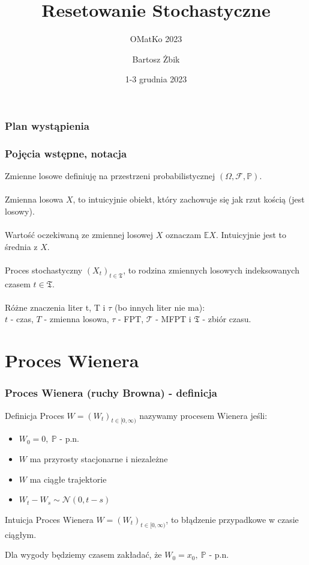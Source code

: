 \documentclass{beamer}
\title{Resetowanie Stochastyczne}
\subtitle{OMatKo 2023}
\author{Bartosz \.Zbik}
\institute{UJ, Kraków}
\date{1-3 grudnia 2023}
\newcommand{\p}{\mathbb{P}}
\newcommand{\E}{\mathbb{E}}
\newcommand{\1}{\mathbb{1}}
\newcommand{\T}{\mathcal{T}}
\newcommand{\F}{\mathcal{F}}
\newcommand{\Time}{\mathfrak{T}}
\begin{document}
\begin{frame}
\titlepage
\end{frame}

\begin{frame}
\frametitle{Plan wystąpienia}
\tableofcontents
\end{frame}



\begin{frame}
\frametitle{Pojęcia wstępne, notacja}
Zmienne losowe definiuję na przestrzeni probabilistycznej $(\Omega, \F, \p)$. \\~\\

Zmienna losowa $X$, to intuicyjnie obiekt, który zachowuje się jak rzut kością (jest losowy).\\~\\

Wartość oczekiwaną ze zmiennej losowej $X$ oznaczam $\E X$. Intuicyjnie jest to średnia z $X$.\\~\\

Proces stochastyczny $(X_t)_{t \in \Time}$, to rodzina zmiennych losowych indeksowanych czasem $t \in \Time$. \\~\\

Różne znaczenia liter t, T i $\tau$ (bo innych liter nie ma): \\
 $t$ - czas, $T$ - zmienna losowa, $\tau$ - FPT, $\T$ - MFPT i $\Time$ - zbiór czasu.

\end{frame}

\section{Proces Wienera}
\begin{frame}
\frametitle{Proces Wienera (ruchy Browna) - definicja}
\begin{block}{Definicja}
Proces $W = (W_t)_{t \in [0, \infty)}$ nazywamy procesem Wienera jeśli:
\begin{itemize}
\item $W_0 = 0, ~\p$ - p.n.
\item $W$ ma przyrosty stacjonarne i niezależne
\item $W$ ma ciągłe trajektorie
\item $W_t - W_s \sim \mathcal{N}(0, t-s)$
\end{itemize}
\end{block}
\begin{block}{Intuicja}
Proces Wienera $W = (W_t)_{t \in [0, \infty)}$, to błądzenie przypadkowe w czasie ciągłym.
\end{block}

Dla wygody będziemy czasem zakładać, że $W_0 = x_0, ~\p$ - p.n.
\end{frame}
\end{document}
